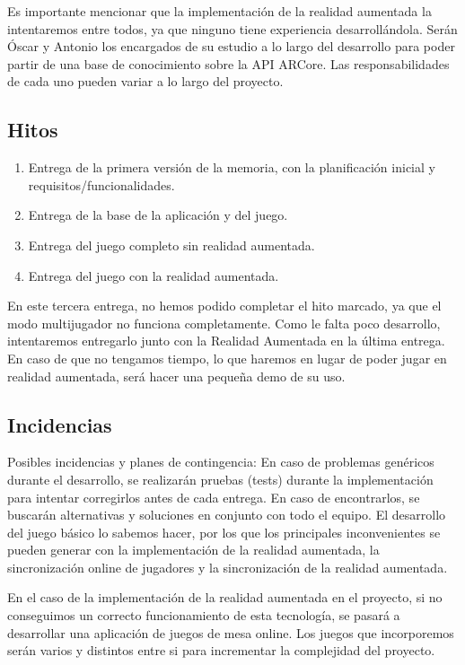 \documentclass[a4paper, openright, 12pt]{article}
\begin{document}
Es importante mencionar que la implementación de la realidad aumentada la intentaremos entre todos, ya que ninguno tiene experiencia desarrollándola. Serán Óscar y Antonio los encargados de su estudio a lo largo del desarrollo para poder partir de una base de conocimiento sobre la API ARCore. Las responsabilidades de cada uno pueden variar a lo largo del proyecto.
\subsection{Hitos}
\begin{enumerate}
    \item Entrega de la primera versión de la memoria, con la planificación inicial y requisitos/funcionalidades.
    \item Entrega de la base de la aplicación y del juego.
    \item Entrega del juego completo sin realidad aumentada.
    \item Entrega del juego con la realidad aumentada.
\end{enumerate}
En este tercera entrega, no hemos podido completar el hito marcado, ya que el modo multijugador no funciona completamente. Como le falta poco desarrollo, intentaremos entregarlo junto con la Realidad Aumentada en la última entrega. En caso de que no tengamos tiempo, lo que haremos en lugar de poder jugar en realidad aumentada, será hacer una pequeña demo de su uso.
\subsection{Incidencias}
Posibles incidencias y planes de contingencia:
En caso de problemas genéricos durante el desarrollo, se realizarán pruebas (tests) durante la implementación para intentar corregirlos antes de cada entrega. En caso de encontrarlos, se buscarán alternativas y soluciones en conjunto con todo el equipo. El desarrollo del juego básico lo sabemos hacer, por los que los principales inconvenientes se pueden generar con la implementación de la realidad aumentada, la sincronización online de jugadores y la sincronización de la realidad aumentada.

En el caso de la implementación de la realidad aumentada en el proyecto, si no conseguimos un correcto funcionamiento de esta tecnología, se pasará a desarrollar una aplicación de juegos de mesa online. Los juegos que incorporemos serán varios y distintos entre si para incrementar la complejidad del proyecto.
\end{document}

